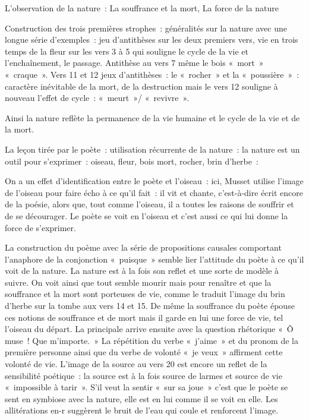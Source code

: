 {L'observation de la nature~: La souffrance et la mort, La force de la nature

Construction des trois premières strophes~: généralités sur la nature avec une longue série
d'exemples~: jeu d'antithèses sur les deux premiers vers, vie en trois temps de la fleur sur les
vers 3 à 5 qui souligne le cycle de la vie et l'enchaînement, le passage. Antithèse au vers 7 même
le bois «~mort~» «~craque~». Vers 11 et 12 jeux d'antithèses~: le «~rocher~» et la «~poussière~»~:
caractère inévitable de la mort, de la destruction mais le vers 12 souligne à nouveau l'effet de
cycle~: «~meurt~»/ «~revivre~».

Ainsi la nature reflète la permanence de la vie humaine et le cycle de la vie et de la mort.

\bigskip

La leçon tirée par le poète~: utilisation récurrente de la nature~: la nature est un outil pour
s'exprimer~: oiseau, fleur, bois mort, rocher, brin d'herbe~:

On a un effet d'identification entre le poète et l'oiseau~: ici, Musset utilise l'image de l'oiseau pour
faire écho à ce qu'il fait~: il vit et chante, c'est-à-dire écrit encore de la poésie, alors que, tout
comme l'oiseau, il a toutes les raisons de souffrir et de se décourager. Le poète se voit en l'oiseau
et c'est aussi ce qui lui donne la force de s'exprimer.

\bigskip

La construction du poème avec la série de propositions causales comportant l'anaphore de la
conjonction «~puisque~» semble lier l'attitude du poète à ce qu'il voit de la nature. La nature est à
la fois son reflet et une sorte de modèle à suivre. On voit ainsi que tout semble mourir mais pour
renaître et que la souffrance et la mort sont porteuses de vie, comme le traduit l'image du brin
d'herbe sur la tombe aux vers 14 et 15. De même la souffrance du poète épouse ces notions de
souffrance et de mort mais il garde en lui une force de vie, tel l'oiseau du départ. La principale
arrive ensuite avec la question rhétorique «~Ô muse~! Que m'importe.~» La répétition du verbe
«~j'aime~» et du pronom de la première personne ainsi que du verbe de volonté «~je veux~»
affirment cette volonté de vie. L'image de la source au vers 20 est encore un reflet de la sensibilité
poétique~: la source est à la fois source de larmes et source de vie «~impossible à tarir~». S'il veut
la sentir «~sur sa joue~» c'est que le poète se sent en symbiose avec la nature, elle est en lui
comme il se voit en elle. Les allitérations en-r suggèrent le bruit de l'eau qui coule et renforcent
l'image.

}
